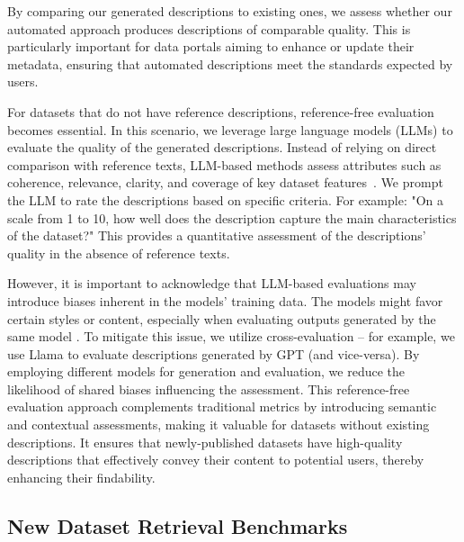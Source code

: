 By comparing our generated descriptions to existing ones, we assess whether our automated approach produces descriptions of comparable quality. This is particularly important for data portals aiming to enhance or update their metadata, ensuring that automated descriptions meet the standards expected by users.

For datasets that do not have reference descriptions, reference-free evaluation becomes essential. In this scenario, we leverage large language models (LLMs) to evaluate the quality of the generated descriptions. Instead of relying on direct comparison with reference texts, LLM-based methods assess attributes such as coherence, relevance, clarity, and coverage of key dataset features~\cite{liu2023geval, gao2024llmEval}. We prompt the LLM to rate the descriptions based on specific criteria. For example: "On a scale from 1 to 10, how well does the description capture the main characteristics of the dataset?" This provides a quantitative assessment of the descriptions' quality in the absence of reference texts.

However, it is important to acknowledge that LLM-based evaluations may introduce biases inherent in the models' training data. The models might favor certain styles or content, especially when evaluating outputs generated by the same model \cite{panickssery2024llm_favor}. To mitigate this issue, we utilize cross-evaluation -- for example, we use Llama to evaluate descriptions generated by GPT (and vice-versa). By employing different models for generation and evaluation, we reduce the likelihood of shared biases influencing the assessment.
% 
This reference-free evaluation approach complements traditional metrics by introducing semantic and contextual assessments, making it valuable for datasets without existing descriptions. It ensures that newly-published datasets have high-quality descriptions that effectively convey their content to potential users, thereby enhancing their findability.

\subsection{New Dataset Retrieval Benchmarks}
\label{sec:dataset_benchmark}


